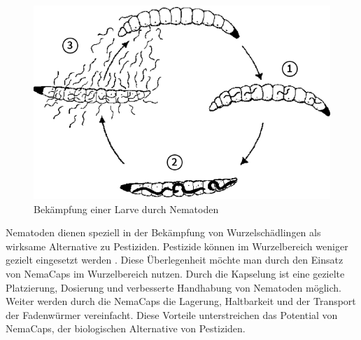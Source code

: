 \begin{figure}
	\includegraphics[scale=0.4]{Illustrationen/3-Einleitung/zyklus_nematoden.png}
\caption{Bekämpfung einer Larve durch Nematoden \protect\cite{e-nema}}
\label{fig:zyklus_Nematoden}
\end{figure}

	
Nematoden dienen speziell in der Bekämpfung von Wurzelschädlingen als wirksame Alternative zu Pestiziden. Pestizide können im Wurzelbereich weniger gezielt eingesetzt werden \cite{nfp}. Diese Überlegenheit möchte man durch den Einsatz von NemaCaps im Wurzelbereich nutzen. Durch die Kapselung ist eine gezielte Platzierung, Dosierung und verbesserte Handhabung von Nematoden möglich. Weiter werden durch die NemaCaps die Lagerung, Haltbarkeit und der Transport der Fadenwürmer vereinfacht. Diese Vorteile unterstreichen das Potential von NemaCaps, der biologischen Alternative von Pestiziden.
